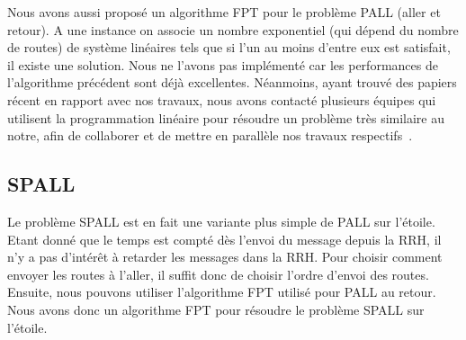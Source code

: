 \documentclass{article}
\begin{document}
Nous avons aussi proposé un algorithme FPT pour le problème PALL (aller et retour). A une instance on associe un nombre exponentiel (qui dépend du nombre de routes) de système linéaires tels que si l'un au moins d'entre eux est satisfait, il existe une solution. Nous ne l'avons pas implémenté car les performances de l'algorithme précédent sont déjà excellentes. Néanmoins, ayant trouvé des papiers récent en rapport avec nos travaux, nous avons contacté plusieurs équipes qui utilisent la programmation linéaire pour résoudre un problème très similaire au notre, afin de collaborer et de mettre en parallèle nos travaux respectifs~\cite{steiner2018traffic,craciunas2017formal}.


     
\subsection{SPALL}
Le problème SPALL est en fait une variante plus simple de PALL sur l'étoile. Etant donné que le temps est compté dès l'envoi du message depuis la RRH, il n'y a pas d'intérêt à retarder les messages dans la RRH. Pour choisir comment envoyer les routes à l'aller, il suffit donc de choisir l'ordre d'envoi des routes. Ensuite, nous pouvons utiliser l'algorithme FPT utilisé pour PALL au retour. Nous avons donc un algorithme FPT pour résoudre le problème SPALL sur l'étoile.
\end{document}
